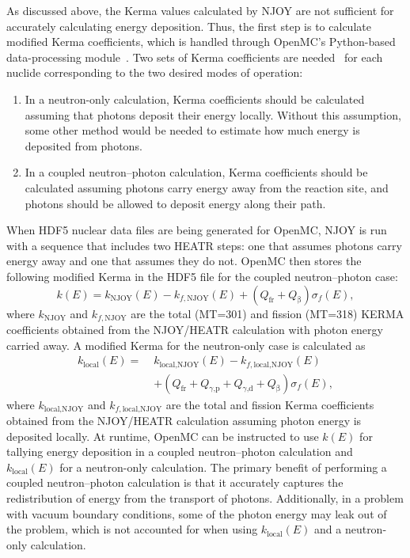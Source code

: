\documentclass{anstrans}
\newcommand{\efr}{Q_\text{fr}}
\newcommand{\egp}{Q_\text{$\gamma$,p}}
\newcommand{\egd}{Q_\text{$\gamma$,d}}
\newcommand{\eb}{Q_\upbeta}
\begin{document}
As discussed above, the Kerma values calculated by NJOY are not sufficient for
accurately calculating energy deposition. Thus, the first step is to calculate
modified Kerma coefficients, which is handled through OpenMC's Python-based 
data-processing module~\cite{romano2017epjwoc}. Two sets of Kerma coefficients are
needed~\cite{trumbull2013mc} for each nuclide corresponding to the two desired
modes of operation:
\begin{enumerate}
    \item In a neutron-only calculation, Kerma coefficients should be calculated
    assuming that photons deposit their energy locally. Without this assumption,
    some other method would be needed to estimate how much energy is deposited
    from photons.
    \item In a coupled neutron--photon calculation, Kerma coefficients should be
    calculated assuming photons carry energy away from the reaction site, and
    photons should be allowed to deposit energy along their path.
\end{enumerate}
When HDF5 nuclear data files are being generated for OpenMC, NJOY is run with a
sequence that includes two HEATR steps: one that assumes photons carry energy
away and one that assumes they do not. OpenMC then stores the following modified
Kerma in the HDF5 file for the coupled neutron--photon case:
\begin{equation}
\label{eq:k}
k(E) = k_\text{NJOY}(E) - k_{f,\text{NJOY}}(E) + \left ( \efr +
        \eb \right ) \sigma_f(E),
\end{equation}
where $k_\text{NJOY}$ and $k_{f,\text{NJOY}}$ are the total (MT=301) and fission
(MT=318) KERMA coefficients obtained from the NJOY/HEATR calculation with photon
energy carried away. A modified Kerma for the neutron-only case is calculated as
\begin{equation}
    \label{eq:klocal}
    \begin{split}
    k_\text{local}(E) = \; &k_\text{local,NJOY}(E) - k_{f,\text{local,NJOY}}(E) \\
        &+ \left ( \efr + \egp + \egd + \eb \right )  \sigma_f(E),
    \end{split}
\end{equation}
where $k_\text{local,NJOY}$ and $k_{f,\text{local,NJOY}}$ are the total and
fission Kerma coefficients obtained from the NJOY/HEATR calculation assuming
photon energy is deposited locally. At runtime, OpenMC can be instructed to use
$k(E)$ for tallying energy deposition in a coupled neutron--photon calculation
and $k_\text{local}(E)$ for a neutron-only calculation. The primary benefit of
performing a coupled neutron--photon calculation is that it accurately captures
the redistribution of energy from the transport of photons. Additionally, in a
problem with vacuum boundary conditions, some of the photon energy may leak out
of the problem, which is not accounted for when using $k_\text{local}(E)$ and a
neutron-only calculation.
\end{document}
